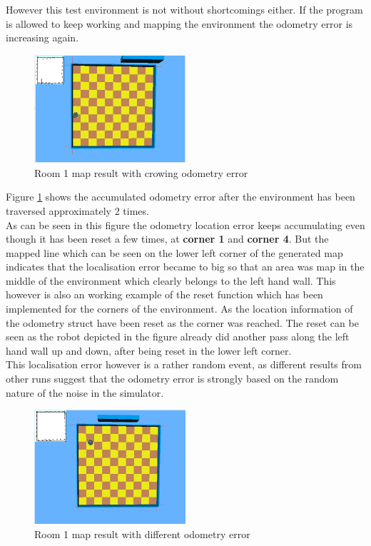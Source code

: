 However this test environment is not without shortcomings either. If the program is allowed to keep working and mapping the environment the odometry error is increasing again.\\

\begin{figure}[h]
\centering
\includegraphics[width = 0.5\textwidth]{../../figures/map_results/odometry_error_and_reset.png}
\caption{Room 1 map result with crowing odometry error}
\label{room1_empty_reset}
\end{figure}

Figure \ref{room1_empty_reset} shows the accumulated odometry error after the environment has been traversed approximately 2 times. \\
As can be seen in this figure the odometry location error keeps accumulating even though it has been reset a few times, at \textbf{corner 1} and \textbf{corner 4}. But the mapped line which can be seen on the lower left corner of the generated map indicates that the localisation error became to big so  that an area was map in the middle of the environment which clearly belongs to the left hand wall.
This however is also an working example of the reset function which has been implemented for the corners of the environment. As the location information of the odometry struct have been reset as the corner was reached. The reset can be seen as the robot depicted in the figure already did another pass along the left hand wall up and down, after being reset in the lower left corner. \\[3ex]

This localisation error however is a rather random event, as different results from other runs suggest that the odometry error is strongly based on the random nature of the noise in the simulator.

\begin{figure}[h]
\centering
\includegraphics[width = 0.5\textwidth]{../../figures/map_results/simulator_noise_mapping.png}
\caption{Room 1 map result with different odometry error}
\label{room1_simulator_noise}
\end{figure}

